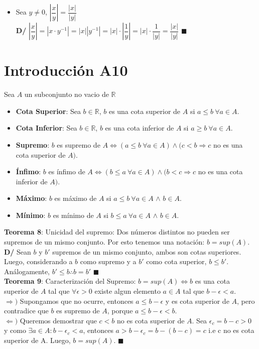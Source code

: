\documentclass[11pt,a4paper]{article}
\newcommand*{\QEDA}{\null\nobreak\hfill\ensuremath{\blacksquare}}
\begin{document}
\begin{itemize}
\item Sea $y \not = 0$, $\left|\dfrac{x}{y}\right| = \dfrac{|x|}{|y|}$\\
\textbf{D/} $\left|\dfrac{x}{y}\right| = |x\cdot y^{-1}| = |x||y^{-1}| = |x| \cdot \left|\dfrac{1}{y}\right| = |x| \cdot \dfrac{1}{|y|} = \dfrac{|x|}{|y|}$ \QEDA
\end{itemize}

\section{Introducci\'on A10}
Sea $A$ un subconjunto no vacio de $\mathbb{R}$
\begin{itemize}
\item \textbf{Cota Superior}: Sea $b \in \mathbb{R}$, $b$ es una cota superior de $A$ si $a \leq b\ \forall a \in A$.
\item \textbf{Cota Inferior}: Sea $b \in \mathbb{R}$, $b$ es una cota inferior de $A$ si $a \geq b\ \forall a \in A$.\\

\item \textbf{Supremo}: $b$ es supremo de $A \iff (a \leq b\ \forall a \in A) \land (c < b \Rightarrow c$ no es una cota superior de $A)$.
\item \textbf{\'Infimo}: $b$ es \'infimo de $A \iff (b \leq a\ \forall a \in A) \land (b < c \Rightarrow c$ no es una cota inferior de $A)$.\\

\item \textbf{M\'aximo}: $b$ es m\'aximo de $A$ si $a \leq b\ \forall a \in A$ $\land$ $b \in A$.
\item \textbf{M\'inimo}: $b$ es m\'inimo de $A$ si $b \leq a\ \forall a \in A$ $\land$ $b \in A$.\\
\end{itemize}

\noindent \textbf{Teorema 8}: Unicidad del supremo: Dos n\'umeros distintos no pueden ser supremos de un mismo conjunto. Por esto tenemos una notaci\'on: $b = sup(A)$.\\
\textbf{D/} Sean $b$ y $b'$ supremos de un mismo conjunto, ambos son cotas superiores. Luego, considerando a $b$ como supremo y a $b'$ como cota superior, $b \leq b'$. An\'alogamente, $b' \leq b \therefore b = b'$ \QEDA\\

\noindent \textbf{Teorema 9}: Caracterizaci\'on del Supremo: $b = sup(A) \iff b$ es una cota superior de $A$ tal que $\forall \epsilon > 0$ existe algun elemento $a \in A$ tal que $b - \epsilon < a$.\\
$\Rightarrow )$ Supongamos que no ocurre, entonces $a \leq b - \epsilon$ y es cota superior de $A$, pero contradice que $b$ es supremo de $A$, porque $a \leq b - \epsilon < b$.\\
$\Leftarrow )$ Queremos demostrar que $c < b$ no es cota superior de $A$. Sea $\epsilon_c = b - c > 0$ y como $\exists a \in A : b - \epsilon_c < a$, entonces $a > b - \epsilon_c = b - (b - c) = c$ i.e c no es cota superior de A. Luego, $b = sup(A)$. \QEDA \\
\end{document}
